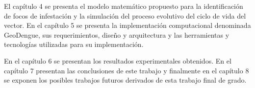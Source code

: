 El capítulo 4 se presenta el modelo matemático propuesto para la identificación de focos de
infestación y la simulación del proceso evolutivo del ciclo de vida del vector. En el capítulo 5
se presenta la implementación computacional denominada GeoDengue, sus requerimientos, diseño y
arquitectura y las herramientas y tecnologías utilizadas para su implementación.

En el capítulo 6 se presentan los resultados experimentales obtenidos. En el capítulo 7
presentan las conclusiones de este trabajo y finalmente en el capítulo 8 se exponen los posibles
trabajos futuros derivados de esta trabajo final de grado.
